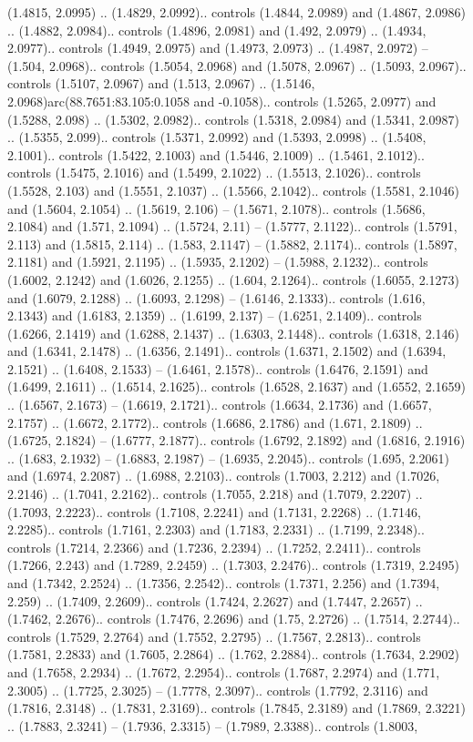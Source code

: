 (1.4815, 2.0995) .. (1.4829, 2.0992).. controls (1.4844, 2.0989) and (1.4867, 2.0986) .. (1.4882, 2.0984).. controls (1.4896, 2.0981) and (1.492, 2.0979) .. (1.4934, 2.0977).. controls (1.4949, 2.0975) and (1.4973, 2.0973) .. (1.4987, 2.0972) -- (1.504, 2.0968).. controls (1.5054, 2.0968) and (1.5078, 2.0967) .. (1.5093, 2.0967).. controls (1.5107, 2.0967) and (1.513, 2.0967) .. (1.5146, 2.0968)arc(88.7651:83.105:0.1058 and -0.1058).. controls (1.5265, 2.0977) and (1.5288, 2.098) .. (1.5302, 2.0982).. controls (1.5318, 2.0984) and (1.5341, 2.0987) .. (1.5355, 2.099).. controls (1.5371, 2.0992) and (1.5393, 2.0998) .. (1.5408, 2.1001).. controls (1.5422, 2.1003) and (1.5446, 2.1009) .. (1.5461, 2.1012).. controls (1.5475, 2.1016) and (1.5499, 2.1022) .. (1.5513, 2.1026).. controls (1.5528, 2.103) and (1.5551, 2.1037) .. (1.5566, 2.1042).. controls (1.5581, 2.1046) and (1.5604, 2.1054) .. (1.5619, 2.106) -- (1.5671, 2.1078).. controls (1.5686, 2.1084) and (1.571, 2.1094) .. (1.5724, 2.11) -- (1.5777, 2.1122).. controls (1.5791, 2.113) and (1.5815, 2.114) .. (1.583, 2.1147) -- (1.5882, 2.1174).. controls (1.5897, 2.1181) and (1.5921, 2.1195) .. (1.5935, 2.1202) -- (1.5988, 2.1232).. controls (1.6002, 2.1242) and (1.6026, 2.1255) .. (1.604, 2.1264).. controls (1.6055, 2.1273) and (1.6079, 2.1288) .. (1.6093, 2.1298) -- (1.6146, 2.1333).. controls (1.616, 2.1343) and (1.6183, 2.1359) .. (1.6199, 2.137) -- (1.6251, 2.1409).. controls (1.6266, 2.1419) and (1.6288, 2.1437) .. (1.6303, 2.1448).. controls (1.6318, 2.146) and (1.6341, 2.1478) .. (1.6356, 2.1491).. controls (1.6371, 2.1502) and (1.6394, 2.1521) .. (1.6408, 2.1533) -- (1.6461, 2.1578).. controls (1.6476, 2.1591) and (1.6499, 2.1611) .. (1.6514, 2.1625).. controls (1.6528, 2.1637) and (1.6552, 2.1659) .. (1.6567, 2.1673) -- (1.6619, 2.1721).. controls (1.6634, 2.1736) and (1.6657, 2.1757) .. (1.6672, 2.1772).. controls (1.6686, 2.1786) and (1.671, 2.1809) .. (1.6725, 2.1824) -- (1.6777, 2.1877).. controls (1.6792, 2.1892) and (1.6816, 2.1916) .. (1.683, 2.1932) -- (1.6883, 2.1987) -- (1.6935, 2.2045).. controls (1.695, 2.2061) and (1.6974, 2.2087) .. (1.6988, 2.2103).. controls (1.7003, 2.212) and (1.7026, 2.2146) .. (1.7041, 2.2162).. controls (1.7055, 2.218) and (1.7079, 2.2207) .. (1.7093, 2.2223).. controls (1.7108, 2.2241) and (1.7131, 2.2268) .. (1.7146, 2.2285).. controls (1.7161, 2.2303) and (1.7183, 2.2331) .. (1.7199, 2.2348).. controls (1.7214, 2.2366) and (1.7236, 2.2394) .. (1.7252, 2.2411).. controls (1.7266, 2.243) and (1.7289, 2.2459) .. (1.7303, 2.2476).. controls (1.7319, 2.2495) and (1.7342, 2.2524) .. (1.7356, 2.2542).. controls (1.7371, 2.256) and (1.7394, 2.259) .. (1.7409, 2.2609).. controls (1.7424, 2.2627) and (1.7447, 2.2657) .. (1.7462, 2.2676).. controls (1.7476, 2.2696) and (1.75, 2.2726) .. (1.7514, 2.2744).. controls (1.7529, 2.2764) and (1.7552, 2.2795) .. (1.7567, 2.2813).. controls (1.7581, 2.2833) and (1.7605, 2.2864) .. (1.762, 2.2884).. controls (1.7634, 2.2902) and (1.7658, 2.2934) .. (1.7672, 2.2954).. controls (1.7687, 2.2974) and (1.771, 2.3005) .. (1.7725, 2.3025) -- (1.7778, 2.3097).. controls (1.7792, 2.3116) and (1.7816, 2.3148) .. (1.7831, 2.3169).. controls (1.7845, 2.3189) and (1.7869, 2.3221) .. (1.7883, 2.3241) -- (1.7936, 2.3315) -- (1.7989, 2.3388).. controls (1.8003, 
